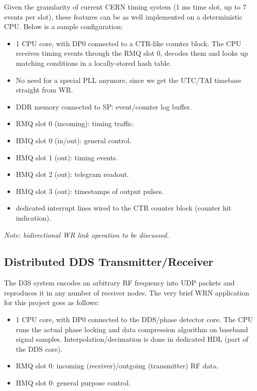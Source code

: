 \documentclass{article}
\begin{document}
Given the granularity of current CERN timing system (1 ms time slot, up to 7 events per slot), these features can be as well implemented on a deterministic CPU. Below is a sample configuration:

\begin{itemize}
\item 1 CPU core, with DP0 connected to a CTR-like counter block. The CPU receives timing events through the RMQ slot 0, decodes them and looks up matching conditions in a locally-stored hash table. 
\item No need for a special PLL anymore, since we get the UTC/TAI timebase straight from WR.
\item DDR memory connected to SP: event/counter log buffer.
\item RMQ slot 0 (incoming): timing traffic.
\item HMQ slot 0 (in/out): general control.
\item HMQ slot 1 (out): timing events.
\item HMQ slot 2 (out): telegram readout.
\item HMQ slot 3 (out): timestamps of output pulses.
\item dedicated interrupt lines wired to the CTR counter block (counter hit indication).
\end{itemize}

\textit{Note: bidirectional WR link operation to be discussed.}

\subsection{Distributed DDS Transmitter/Receiver}

The D3S system \cite{wr-d3s} encodes an arbitrary RF frequency into UDP packets and reproduces it in any number of receiver nodes. The very brief WRN application for this project goes as follows:

\begin{itemize}
\item 1 CPU core, with DP0 connected to the DDS/phase detector core. The CPU runs the actual phase locking and data compression algorithm on baseband signal samples. Interpolation/decimation is done in dedicated HDL (part of the DDS core).
\item RMQ slot 0: incoming (receiver)/outgoing (transmitter) RF data.
\item HMQ slot 0: general purpose control.
\end{itemize}
\end{document}
